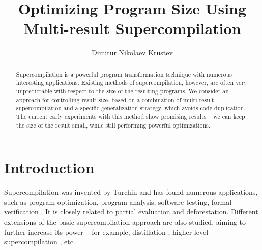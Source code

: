\documentclass[submission,copyright,creativecommons]{eptcs}
\title{Optimizing Program Size Using Multi-result Supercompilation}
\author{Dimitur Nikolaev Krustev
\institute{IGE+XAO Balkan\\ Sofia, Bulgaria}
\email{\quad dkrustev@ige-xao.com}
}
\begin{document}
\maketitle

\begin{abstract}
Supercompilation is a powerful program transformation technique with numerous interesting applications.
Existing methods of supercompilation, however, are often very unpredictable with respect to the size
of the resulting programs.
We consider an approach for controlling result size, based on a combination of multi-result
supercompilation and a specific generalization strategy, which avoids code duplication.
The current early experiments with this method show promising results -- we can keep
the size of the result small, while still performing powerful optimizations.
\end{abstract}

\section{Introduction}

Supercompilation was invented by Turchin \cite{TurchinSupercompilerConcept} and has found numerous
applications, such as program optimization\cite{Sorensen1994TurchinSupercompiler,sorm98b,TMR/SCP2014}, 
program analysis, software testing, formal verification \cite{Klyuchnikov2010,Lisitsa2017,MendelGleasonPhD2011}.
It is closely related to partial evaluation \cite{Jones:1993:PEA:153676} and deforestation.
Different extensions of the basic supercompilation approach are also studied, aiming to further increase
its power -- for example, distillation \cite{Hamilton07}, higher-level supercompilation \cite{Klyuchnikov:META2010:HigherLevelScp}, etc.
\end{document}
